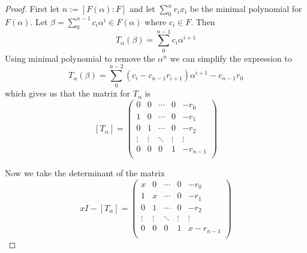 \documentclass[10pt]{article}
\theoremstyle{plain}
\theoremstyle{remark}
\begin{document}
\begin{proof}
  First let $n:=[F(\alpha):F]$ and let $\sum_0^nr_ix_i$ be the minimal polynomial for
  $F(\alpha)$. Let $\beta=\sum_0^{n-1}c_i\alpha^i\in F(\alpha)$ where $c_i\in F$. Then
  \[T_\alpha(\beta)=\sum_0^{n-1}c_i\alpha^{i+1} \]
  Using minimal polynomial to remove the $\alpha^n$ we can simplify the expression to
  \[ T_\alpha(\beta)=\sum_0^{n-2}(c_i-c_{n-1}r_{i+1})\alpha^{i+1}-c_{n-1}r_0 \]
  which gives us that the matrix for $T_\alpha$ is
  \[
    [T_\alpha]=
    \left(
      \begin{array}{ccccc}
        0&0&\cdots&0&-r_0\\
        1&0&\cdots&0&-r_1\\
        0&1&\cdots&0&-r_2\\
        \vdots&\vdots&\ddots&\vdots&\vdots\\
        0&0&0&1&-r_{n-1}\\
      \end{array}
    \right)
  \]

  Now we take the determinant of the matrix
  \[
    xI-[T_\alpha] =
    \left(
      \begin{array}{ccccc}
        x&0&\cdots&0&-r_0\\
        1&x&\cdots&0&-r_1\\
        0&1&\cdots&0&-r_2\\
        \vdots&\vdots&\ddots&\vdots&\vdots\\
        0&0&0&1&x-r_{n-1}\\
      \end{array}
    \right)
  \]
\end{proof}

\end{document}
